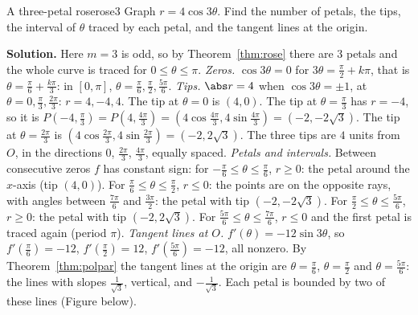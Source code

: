 \documentclass[11pt]{article}
\begin{document}
\begin{exmp}{A three-petal rose}{rose3}
Graph $r=4\cos3\theta$. Find the number of petals, the tips, the interval of $\theta$ traced by each petal, and the tangent lines at the origin.

\textbf{Solution.} Here $m=3$ is odd, so by Theorem~\ref{thm:rose} there are $3$ petals and the whole curve is traced for $0\le\theta\le\pi$. \emph{Zeros.} $\cos3\theta=0$ for $3\theta=\frac\pi2+k\pi$, that is $\theta=\frac\pi6+\frac{k\pi}3$: in $[0,\pi]$, $\theta=\frac\pi6,\frac\pi2,\frac{5\pi}6$. \emph{Tips.} $\abs r=4$ when $\cos3\theta=\pm1$, at $\theta=0,\frac\pi3,\frac{2\pi}3$: $r=4,-4,4$. The tip at $\theta=0$ is $(4,0)$. The tip at $\theta=\frac\pi3$ has $r=-4$, so it is $P\left(-4,\frac\pi3\right)=P\left(4,\frac{4\pi}3\right)=\left(4\cos\frac{4\pi}3,4\sin\frac{4\pi}3\right)=(-2,-2\sqrt3)$. The tip at $\theta=\frac{2\pi}3$ is $\left(4\cos\frac{2\pi}3,4\sin\frac{2\pi}3\right)=(-2,2\sqrt3)$. The three tips are $4$ units from $O$, in the directions $0$, $\frac{2\pi}3$, $\frac{4\pi}3$, equally spaced.
\emph{Petals and intervals.} Between consecutive zeros $f$ has constant sign: for $-\frac\pi6\le\theta\le\frac\pi6$, $r\ge0$: the petal around the $x$-axis (tip $(4,0)$). For $\frac\pi6\le\theta\le\frac\pi2$, $r\le0$: the points are on the opposite rays, with angles between $\frac{7\pi}6$ and $\frac{3\pi}2$: the petal with tip $(-2,-2\sqrt3)$. For $\frac\pi2\le\theta\le\frac{5\pi}6$, $r\ge0$: the petal with tip $(-2,2\sqrt3)$. For $\frac{5\pi}6\le\theta\le\frac{7\pi}6$, $r\le0$ and the first petal is traced again (period $\pi$).
\emph{Tangent lines at $O$.} $f'(\theta)=-12\sin3\theta$, so $f'\left(\frac\pi6\right)=-12$, $f'\left(\frac\pi2\right)=12$, $f'\left(\frac{5\pi}6\right)=-12$, all nonzero. By Theorem~\ref{thm:polpar} the tangent lines at the origin are $\theta=\frac\pi6$, $\theta=\frac\pi2$ and $\theta=\frac{5\pi}6$: the lines with slopes $\frac1{\sqrt3}$, vertical, and $-\frac1{\sqrt3}$. Each petal is bounded by two of these lines (Figure below).
\end{exmp}
\end{document}
